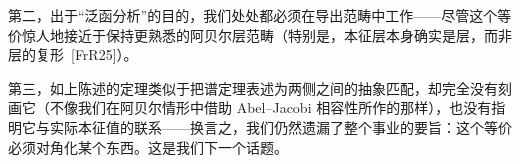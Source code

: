 第二，出于“泛函分析”的目的，我们处处都必须在导出范畴中工作——尽管这个等价惊人地接近于保持更熟悉的阿贝尔层范畴（特别是，本征层本身确实是层，而非层的复形~[FrR25]）。

第三，如上陈述的定理类似于把谱定理表述为两侧之间的抽象匹配，却完全没有刻画它（不像我们在阿贝尔情形中借助 Abel–Jacobi 相容性所作的那样），也没有指明它与实际本征值的联系——换言之，我们仍然遗漏了整个事业的要旨：这个等价必须对角化某个东西。这是我们下一个话题。
